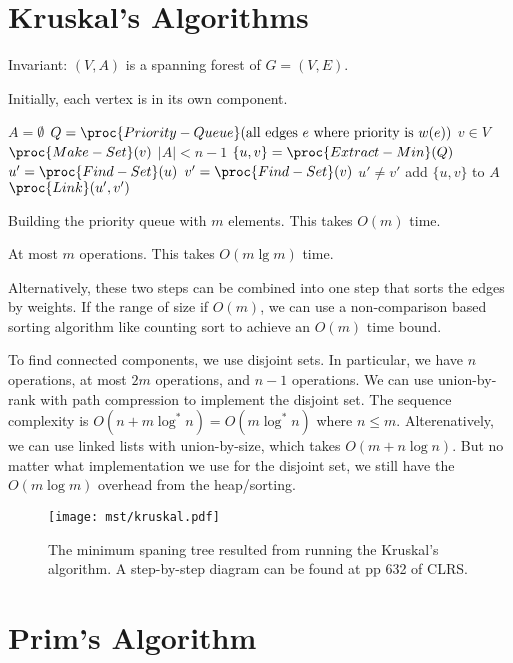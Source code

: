 \section{Kruskal's Algorithms}

Invariant: $(V,A)$ is a spanning forest of $G = (V,E)$.

Initially, each vertex is in its own component.
\begin{codebox}
    \li $A =  \emptyset$
    \li $Q = \proc{Priority-Queue}(\text{all edges $e$ where priority is $w(e)$})$
    \li \For $v \in V$ \Do
        \li $\proc{Make-Set}(v)$
        \End
    \li \While $|A| < n-1$ \Do 
        \li $\{u,v\} = \proc{Extract-Min}(Q)$ 
        \li $u' = \proc{Find-Set}(u)$
        \li $v' = \proc{Find-Set}(v)$
        \li {}
        \li \If $u' \neq v'$  \Then
            \li add $\{u,v\}$ to $A$ 
            \li $\proc{Link}(u',v')$
\end{codebox}

Building the priority queue with $m$ elements. This takes $O(m)$ time.

At most $m$  operations. This takes $O(m \lg m)$ time.

Alternatively, these two steps can be combined into one step that sorts the edges by weights. If the range of size if $O(m)$, we can use a non-comparison based sorting algorithm like counting sort to achieve an $O(m)$ time bound.

To find connected components, we use disjoint sets. In particular, we have $n$  operations, at most $2m$  operations, and $n-1$  operations. We can use union-by-rank with path compression to implement the disjoint set. The sequence complexity is $O(n + m \log^* n) = O(m \log^*n)$ where $n \leq m$. Alterenatively, we can use linked lists with union-by-size, which takes $O(m + n \log n)$. But no matter what implementation we use for the disjoint set, we still have the $O(m \log m)$ overhead from the heap/sorting.

\begin{figure}
    \centering
    \texttt{[image: mst/kruskal.pdf]}
    \caption{The minimum spaning tree resulted from running the Kruskal's algorithm. A step-by-step diagram can be found at pp 632 of CLRS.}
\end{figure}


\section{Prim's Algorithm}

